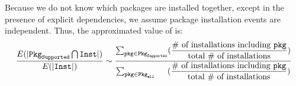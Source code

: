 Because we do not know which packages are installed together,
except in the presence of explicit dependencies,
we assume package installation events are independent.
Thus, the approximated value of \compatmetric{} is:
\begin{align*}
\frac{E(|\mathtt{Pkg}_\mathtt{Supported} \bigcap \mathtt{Inst}|)}{E(|\mathtt{Inst}|)}
\sim \dfrac{\sum_{\mathtt{pkg} \in \mathtt{Pkg}_\mathtt{Supported}} (\dfrac{\text{\# of installations including $\mathtt{pkg}$}}{\text{total \# of installations}})}{\sum_{\mathtt{pkg} \in \mathtt{Pkg}_\mathtt{all\hspace{0.21in}}} (\dfrac{\text{\# of installations including $\mathtt{pkg}$}}{\text{total \# of installations}})}
\end{align*}
